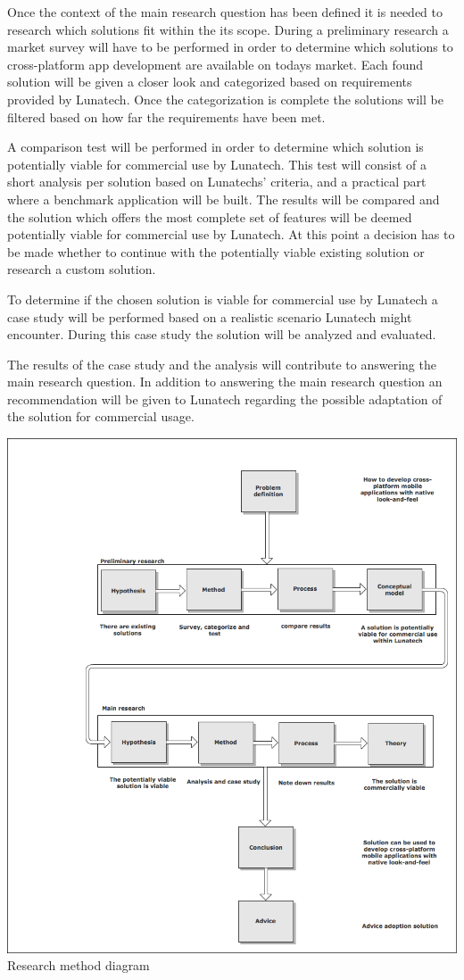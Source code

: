 Once the context of the main research question has been defined it is needed to research which solutions fit within the its scope. During a preliminary research a market survey will have to be performed in order to determine which solutions to cross-platform app development are available on todays market. Each found solution will be given a closer look and categorized based on requirements provided by Lunatech. Once the categorization is complete the solutions will be filtered based on how far the requirements have been met.

A comparison test will be performed in order to determine which solution is potentially viable for commercial use by Lunatech. This test will consist of a short analysis per solution based on Lunatechs' criteria, and a practical part where a benchmark application will be built. The results will be compared and the solution which offers the most complete set of features will be deemed potentially viable for commercial use by Lunatech. At this point a decision has to be made whether to continue with the potentially viable existing solution or research a custom solution. 

To determine if the chosen solution is viable for commercial use by Lunatech a case study will be performed based on a realistic scenario Lunatech might encounter. During this case study the solution will be analyzed and evaluated.

The results of the case study and the analysis will contribute to answering the main research question. In addition to answering the main research question an recommendation will be given to Lunatech regarding the possible adaptation of the solution for commercial usage.


\newpage
\begin{centering}
\includegraphics[scale=0.6]{images/researchprocess.png}\\{Research method diagram}\\
\end{centering}


